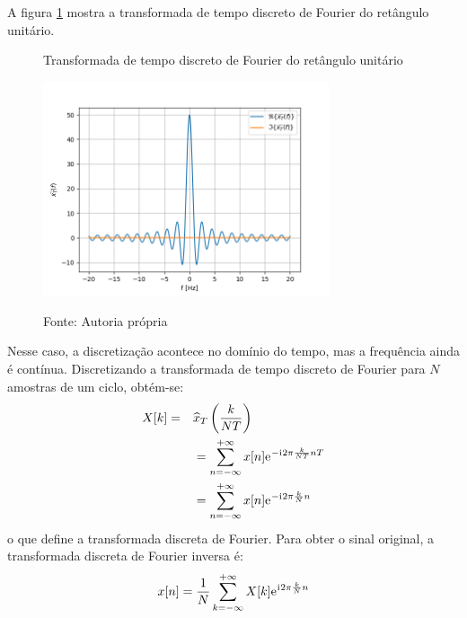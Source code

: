 \documentclass[12pt,a4paper]{report}
\newcommand{\I}{{\mathrm{i}\mkern1mu}}
\newcommand{\euler}{{\mathrm{e}\mkern1mu}}
\begin{document}
  A figura \ref{fig:discrete_time_fourier_transform} mostra a transformada de tempo discreto de Fourier do
  retângulo unitário.
  \begin{figure}[H]
    \caption{Transformada de tempo discreto de Fourier do retângulo unitário}
    \centering
    \includegraphics[width=0.75\textwidth]{discrete_time_fourier_transform}
    \label{fig:discrete_time_fourier_transform}
    \caption*{Fonte: Autoria própria}
  \end{figure}
  Nesse caso, a discretização acontece no domínio do tempo, mas a frequência ainda é contínua. Discretizando a
  transformada de tempo discreto de Fourier para $N$ amostras de um ciclo, obtém-se:
  \begin{equation}
    \begin{split}
      X[k] = &\quad \widehat{x}_T\left(\frac{k}{N T}\right)
      \\ &\quad = \sum_{n = -\infty}^{+\infty} x[n] \euler^{-\I 2 \pi \frac{k}{N T} n T}
      \\ &\quad = \sum_{n = -\infty}^{+\infty} x[n] \euler^{-\I 2 \pi \frac{k}{N} n}
    \end{split}
  \end{equation}
  o que define a transformada discreta de Fourier. Para obter o sinal original, a transformada discreta de
  Fourier inversa é:
  \begin{equation}
    x[n] = \frac{1}{N} \sum_{k = -\infty}^{+\infty} X[k] \euler^{\I 2 \pi \frac{k}{N} n}
  \end{equation}
  
\end{document}
